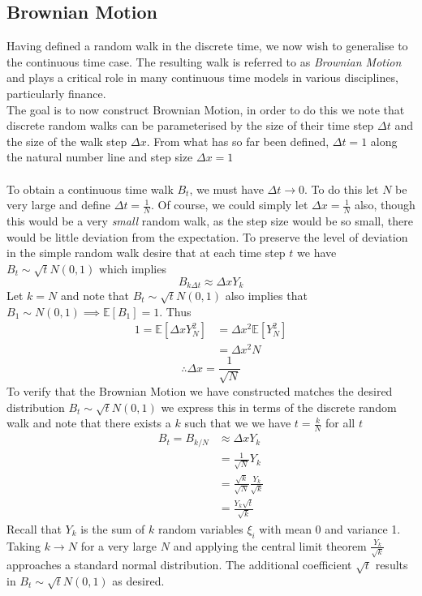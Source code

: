 \documentclass{article}
\begin{document}
\subsection{Brownian Motion}
Having defined a random walk in the discrete time, we now wish to generalise to the continuous time case. The resulting walk is referred to as \textit{Brownian Motion} and plays a critical role in many continuous time models in various disciplines, particularly finance. \\
The goal is to now construct Brownian Motion, in order to do this we note that discrete random walks can be parameterised by the size of their time step $\Delta t$ and the size of the walk step $\Delta x$. From what has so far been defined, $\Delta t = 1$ along the natural number line and step size $\Delta x=1$ \\
\\
To obtain a continuous time walk $B_t$, we must have $\Delta t\longrightarrow0$. To do this let $N$ be very large and define $\Delta t = \frac{1}{N}$. Of course, we could simply let $\Delta x = \frac{1}{N}$ also, though this would be a very \textit{small} random walk, as the step size would be so small, there would be little deviation from the expectation. To preserve the level of deviation in the simple random walk desire that at each time step $t$ we have $B_t \sim \sqrt{t}N(0, 1)$ which implies
$$B_{k\Delta t} \approx \Delta x Y_k$$
Let $k=N$ and note that $B_t \sim \sqrt{t}N(0, 1)$ also implies that $B_1 \sim N(0,1) \implies \mathbb{E}[B_1] = 1$. Thus
\begin{align*}
    1 = \mathbb{E}[\Delta x Y_N^2] &= \Delta x^2 \mathbb{E}[Y_N^2] \\
    &= \Delta x^2 N
\end{align*}
$$\therefore \Delta x = \frac{1}{\sqrt{N}}$$
To verify that the Brownian Motion we have constructed matches the desired distribution $B_t \sim \sqrt{t}N(0,1)$ we express this in terms of the discrete random walk and note that there exists a $k$ such that we we have $t = \frac{k}{N}$ for all $t$
\begin{align*}
    B_t = B_{k/N} &\approx \Delta x Y_k\\
    &= \frac{1}{\sqrt{N}} Y_{k} \\
    &= \frac{\sqrt{k}}{\sqrt{N}} \frac{Y_k}{\sqrt{k}} \\
    &= \frac{Y_k\sqrt{t}}{\sqrt{k}}
\end{align*}
Recall that $Y_k$ is the sum of $k$ random variables $\xi_i$ with mean 0 and variance 1. Taking $k\longrightarrow N$ for a very large $N$ and applying the central limit theorem $\frac{Y_k}{\sqrt{k}}$ approaches a standard normal distribution. The additional coefficient $\sqrt{t}$ results in $B_t \sim \sqrt{t}N(0,1)$ as desired. \\
\end{document}
